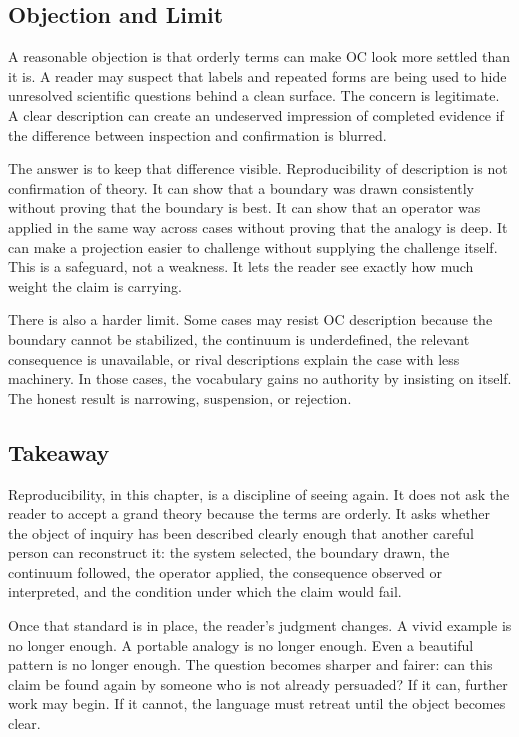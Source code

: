 \documentclass[11pt,a4paper,openany]{book}
\begin{document}
\subsection{Objection and Limit}
A reasonable objection is that orderly terms can make OC look more settled than it is. A reader may suspect that labels and repeated forms are being used to hide unresolved scientific questions behind a clean surface. The concern is legitimate. A clear description can create an undeserved impression of completed evidence if the difference between inspection and confirmation is blurred. \cite{prigogine_dissipative,haken_synergetics}\par
The answer is to keep that difference visible. Reproducibility of description is not confirmation of theory. It can show that a boundary was drawn consistently without proving that the boundary is best. It can show that an operator was applied in the same way across cases without proving that the analogy is deep. It can make a projection easier to challenge without supplying the challenge itself. This is a safeguard, not a weakness. It lets the reader see exactly how much weight the claim is carrying.\par
There is also a harder limit. Some cases may resist OC description because the boundary cannot be stabilized, the continuum is underdefined, the relevant consequence is unavailable, or rival descriptions explain the case with less machinery. In those cases, the vocabulary gains no authority by insisting on itself. The honest result is narrowing, suspension, or rejection.\par
\subsection{Takeaway}
Reproducibility, in this chapter, is a discipline of seeing again. It does not ask the reader to accept a grand theory because the terms are orderly. It asks whether the object of inquiry has been described clearly enough that another careful person can reconstruct it: the system selected, the boundary drawn, the continuum followed, the operator applied, the consequence observed or interpreted, and the condition under which the claim would fail. \cite{prigogine_dissipative,haken_synergetics}\par
Once that standard is in place, the reader's judgment changes. A vivid example is no longer enough. A portable analogy is no longer enough. Even a beautiful pattern is no longer enough. The question becomes sharper and fairer: can this claim be found again by someone who is not already persuaded? If it can, further work may begin. If it cannot, the language must retreat until the object becomes clear.\par
\end{document}

